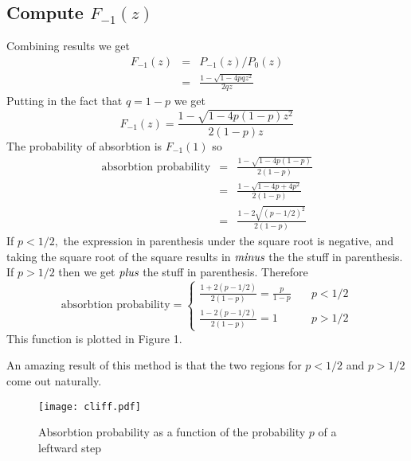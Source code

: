 \documentclass{article}
\begin{document}
\subsection{Compute $F_{-1}(z)$}

Combining results we get\begin{eqnarray*}
F_{-1}(z) & = & P_{-1}(z)/P_{0}(z)\\
 & = & \frac{1-\sqrt{1-4pqz^{2}}}{2qz}\end{eqnarray*}
Putting in the fact that $q=1-p$ we get \begin{equation}
F_{-1}(z)=\frac{1-\sqrt{1-4p(1-p)z^{2}}}{2(1-p)z} \end{equation}
The probability of absorbtion is $F_{-1}(1)$ so\begin{eqnarray*}
\textrm{absorbtion probability} & = & \frac{1-\sqrt{1-4p(1-p)}}{2(1-p)}\\
 & = & \frac{1-\sqrt{1-4p+4p^{2}}}{2(1-p)}\\
 & = & \frac{1-2\sqrt{(p-1/2)^{2}}}{2(1-p)}\end{eqnarray*}
If $p<1/2,$ the expression in parenthesis under the square root is negative, and taking the square root of the square results in $\emph{minus}$ the the stuff in parenthesis. If $p>1/2$ then we get $\emph{plus}$ the stuff in parenthesis. Therefore \begin{equation}
\textrm{absorbtion probability}=\begin{cases}
\frac{1+2(p-1/2)}{2(1-p)}=\frac{p}{1-p} & \quad p<1/2\\
\frac{1-2(p-1/2)}{2(1-p)}=1 & \quad p>1/2\end{cases} \end{equation}
This function is plotted in Figure 1.

An amazing result of this method is that the two regions for $p<1/2$ and $p>1/2$ come out naturally.

\begin{figure}
\begin{centering}
\texttt{[image: cliff.pdf]}
\par\end{centering}
\caption{Absorbtion probability as a function of the probability $p$ of a
leftward step}
\end{figure}
\end{document}
